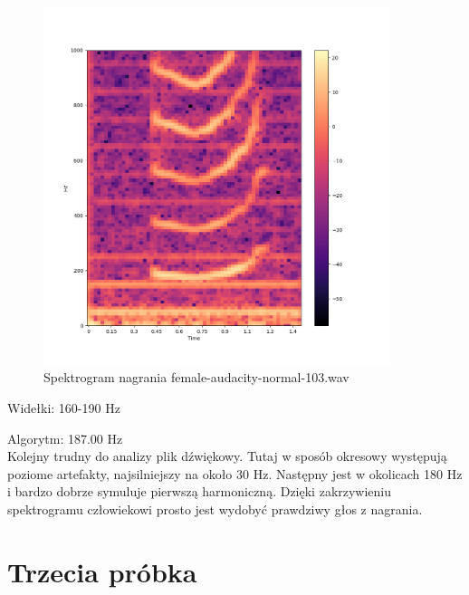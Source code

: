 \documentclass[a4paper,12pt]{extarticle}
\begin{document}
\begin{figure}[h!]
\centering
\includegraphics[width=0.9\textwidth]{female-audacity-normal-103}
\caption{Spektrogram nagrania female-audacity-normal-103.wav}
\end{figure}

\noindent Widełki: 160-190 Hz

\noindent Algorytm: 187.00 Hz\\

\noindent Kolejny trudny do analizy plik dźwiękowy. Tutaj w sposób okresowy występują poziome artefakty, najsilniejszy na około 30 Hz. Następny jest w okolicach 180 Hz i bardzo dobrze symuluje pierwszą harmoniczną. Dzięki zakrzywieniu spektrogramu człowiekowi prosto jest wydobyć prawdziwy głos z nagrania.

\clearpage

\section*{Trzecia próbka}
\end{document}
